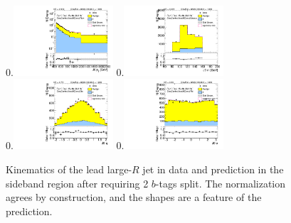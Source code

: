 \clearpage

\begin{figure}[htbp!]
\begin{center}
0.\includegraphics[width=0.33\textwidth, angle=270]{./figures/boosted/Control/Moriond_TwoTag_split_Control_leadHCand_Pt_m_1.pdf}
0.\includegraphics[width=0.33\textwidth, angle=270]{./figures/boosted/Control/Moriond_TwoTag_split_Control_leadHCand_Mass_s.pdf}\\
0.\includegraphics[width=0.33\textwidth, angle=270]{./figures/boosted/Control/Moriond_TwoTag_split_Control_leadHCand_Eta.pdf}
0.\includegraphics[width=0.33\textwidth, angle=270]{./figures/boosted/Control/Moriond_TwoTag_split_Control_leadHCand_Phi.pdf}
  \caption{Kinematics of the lead large-$R$ jet in data and prediction in the sideband region after requiring 2 $b$-tags split. The normalization agrees by construction, and the shapes are a feature of the prediction.}
  \label{fig:boosted-2bs-control-ak10-lead}
\end{center}
\end{figure}

